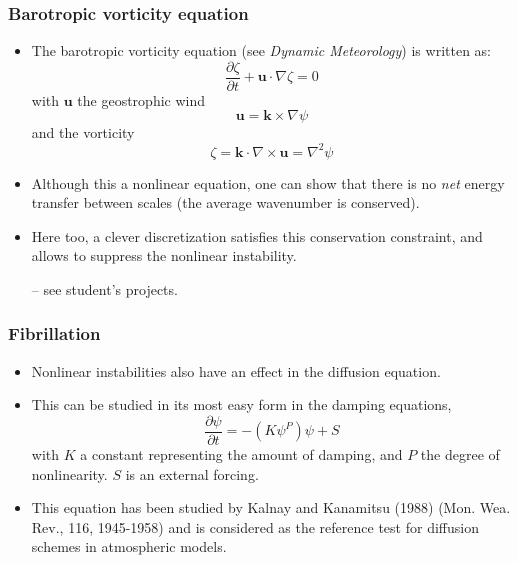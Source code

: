 \documentclass[aspectratio=149,9pt]{beamer}
\begin{document}
%
%
\begin{frame}
	\frametitle{Barotropic vorticity equation}
	\begin{itemize}
		\item The barotropic vorticity equation (see \emph{Dynamic Meteorology}) is written as:
			\begin{equation*}
				\frac{\partial \zeta}{\partial t} + \bm u \cdot \nabla \zeta = 0
			\end{equation*}
			with $\bm u$ the geostrophic wind\vspace*{-1mm}
			\begin{equation*}
				\bm u = \bm k \times \nabla \psi
			\end{equation*}
			and the vorticity\vspace*{-1mm}
			\begin{equation*}
				\zeta = \bm k \cdot \nabla \times \bm u =\nabla^2\psi
			\end{equation*}
		\item Although this a nonlinear equation, one can show that there is no \emph{net} energy transfer between scales (the average wavenumber is conserved).
		\item Here too, a clever discretization satisfies this conservation constraint, and allows to suppress the nonlinear instability.
			\par\vspace*{2ex}
			-- see student's projects.
	\end{itemize}
\end{frame}
%
%
\begin{frame}
	\frametitle{Fibrillation}
	\begin{itemize}
		\item Nonlinear instabilities also have an effect in the diffusion equation.\vspace*{2ex}
		\item This can be studied in its most easy form in the damping equations,
			\begin{equation*}
				\frac{\partial \psi}{\partial t} = - \left( K \psi^P \right) \psi + S
			\end{equation*}
			with $K$ a constant representing the amount of damping, and $P$ the degree of nonlinearity. $S$ is an external forcing.\vspace*{2ex}
		\item This equation has been studied by Kalnay and Kanamitsu (1988) (Mon. Wea. Rev., 116, 1945-1958) and is considered as the reference test for diffusion schemes in atmospheric models.
	\end{itemize}
\end{frame}
\end{document}
